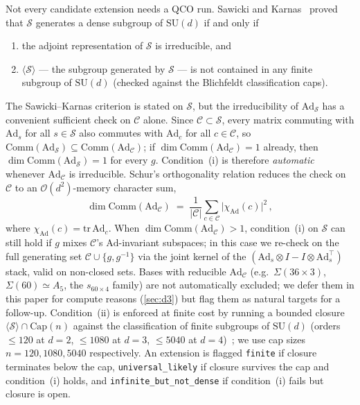\documentclass[twocolumn,superscriptaddress,showpacs,nofootinbib,notitlepage,preprintnumbers,secnumarabic,amssymb, nobibnotes, aps, prd]{revtex4-2}
\newcommand{\Sigmathree}[1]{\Sigma(#1\!\times\!3)} %
\begin{document}
Not every candidate extension needs a QCO run. Sawicki and Karnas~\cite{Sawicki:2016kmo} proved that $\mathcal{S}$ generates a dense subgroup of $\mathrm{SU}(d)$ if and only if
\begin{enumerate}[label=(\roman*), leftmargin=*]
  \item the adjoint representation of $\mathcal{S}$ is irreducible, and
  \item $\langle\mathcal{S}\rangle$ --- the subgroup generated by $\mathcal{S}$ --- is not contained in any finite subgroup of $\mathrm{SU}(d)$ (checked against the Blichfeldt classification caps).
\end{enumerate}
The Sawicki--Karnas criterion is stated on $\mathcal{S}$, but the irreducibility of $\mathrm{Ad}_\mathcal{S}$ has a convenient sufficient check on $\mathcal{C}$ alone. Since $\mathcal{C}\subset\mathcal{S}$, every matrix commuting with $\mathrm{Ad}_s$ for all $s\in\mathcal{S}$ also commutes with $\mathrm{Ad}_c$ for all $c\in\mathcal{C}$, so $\mathrm{Comm}(\mathrm{Ad}_\mathcal{S})\subseteq\mathrm{Comm}(\mathrm{Ad}_\mathcal{C})$; if $\dim\mathrm{Comm}(\mathrm{Ad}_\mathcal{C})=1$ already, then $\dim\mathrm{Comm}(\mathrm{Ad}_\mathcal{S})=1$ for every $g$. Condition~(i) is therefore \emph{automatic} whenever $\mathrm{Ad}_\mathcal{C}$ is irreducible. Schur's orthogonality relation reduces the check on $\mathcal{C}$ to an $\mathcal{O}(d^2)$-memory character sum,
\begin{equation}
  \dim \mathrm{Comm}(\mathrm{Ad}_{\mathcal{C}}) \;=\; \frac{1}{|\mathcal{C}|} \sum_{c \in \mathcal{C}} \bigl|\chi_\mathrm{Ad}(c)\bigr|^2\,,
  \label{eq:comm_dim}
\end{equation}
where $\chi_\mathrm{Ad}(c) = \mathrm{tr}\,\mathrm{Ad}_c$. When $\dim\mathrm{Comm}(\mathrm{Ad}_\mathcal{C})>1$, condition~(i) on $\mathcal{S}$ can still hold if $g$ mixes $\mathcal{C}$'s $\mathrm{Ad}$-invariant subspaces; in this case we re-check on the full generating set $\mathcal{C}\cup\{g, g^{-1}\}$ via the joint kernel of the $(\mathrm{Ad}_s\otimes I-I\otimes\mathrm{Ad}_s^\top)$ stack, valid on non-closed sets. Bases with reducible $\mathrm{Ad}_\mathcal{C}$ (e.g.\ $\Sigmathree{36}$, $\Sigma(60)\simeq A_5$, the $s_{60\times 4}$ family) are not automatically excluded; we defer them in this paper for compute reasons (\cref{sec:d3}) but flag them as natural targets for a follow-up. Condition~(ii) is enforced at finite cost by running a bounded closure $\langle \mathcal{S} \rangle \cap \mathrm{Cap}(n)$ against the classification of finite subgroups of $\mathrm{SU}(d)$ (orders $\leq 120$ at $d=2$, $\leq 1080$ at $d=3$, $\leq 5040$ at $d=4$)~\cite{Blichfeldt:1917,Fairbairn:1964,Flyvbjerg:1985,HananyHe:2001,GrimusLudl:2010}; we use cap sizes $n = 120, 1080, 5040$ respectively. An extension is flagged \texttt{finite} if closure terminates below the cap, \texttt{universal\_likely} if closure survives the cap and condition~(i) holds, and \texttt{infinite\_but\_not\_dense} if condition~(i) fails but closure is open.
\end{document}
